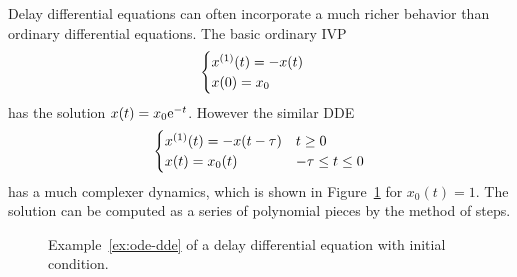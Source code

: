     \begin{example}\label{ex:ode-dde}
        Delay differential equations can often incorporate a much richer behavior than ordinary differential equations.
        The basic ordinary IVP
        \begin{equation}
            \begin{cases}
                \D{x}(t) = -x(t)\\
                x(0) = x_0
            \end{cases}
        \end{equation}
        has the solution $x(t)=x_0 \mathrm{e}^{-t}$. However the similar DDE
        \begin{equation}
            \begin{cases}
                \D{x}(t) = -x(t-\tau) & t\geq 0\\
                x(t) = x_0(t) & -\tau\leq t\leq 0
            \end{cases}
        \end{equation}
        has a much complexer dynamics, which is shown in Figure~\ref{fig:plot-ex-dde} for $x_0(t)=1$. The solution can be computed as a series of polynomial pieces by the method of steps.   
    \end{example}

    \begin{figure}[b]
        \centering
        
    	\caption{Example~\ref{ex:ode-dde} of a delay differential equation with initial condition.}
    	\label{fig:plot-ex-dde}
    \end{figure}
